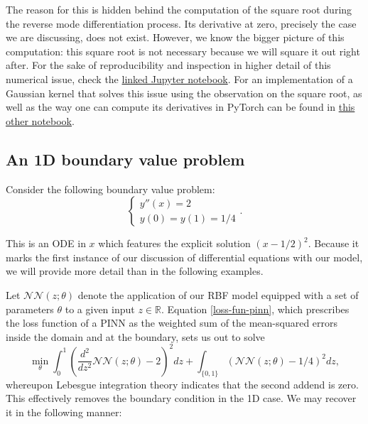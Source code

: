 \documentclass[12pt]{report} %
\begin{document}
The reason for this is hidden behind the computation of the square root during the reverse
mode differentiation process. Its derivative at zero, precisely the case we
are discussing, does not exist.
However, we know the bigger picture of this computation: this square root is not
necessary because we will square it out right after. For the sake of reproducibility
and inspection in higher detail of this numerical issue, check the
\href{https://github.com/heqro/tfm-experiments/blob/main/introductory_notebooks/differentials_computation/differentials_rbf_NANs.ipynb}{linked
  Jupyter notebook}. For an implementation of a Gaussian kernel that solves this issue
using the observation on the square root, as well
as the way one can compute its derivatives in PyTorch can be found in
\href{https://github.com/heqro/tfm-experiments/blob/main/introductory_notebooks/differentials_computation/differentials_rbf_NANs_fixed.ipynb}
{this other notebook}.

\subsection*{An 1D boundary value problem}

Consider the following boundary value problem:
\[ \left\{\begin{array}{l}
    y'' (x) = 2 \\
    y (0) = y (1) = 1 / 4
  \end{array}\right. . \]

This is an ODE in $x$ which features the explicit solution $(x - 1 / 2)^2$.
Because it marks the first instance of our discussion of differential equations
with our model, we will provide more detail than in the following examples.

Let $\mathcal{N}\mathcal{N} (z ; \theta)$ denote the application of our RBF
model equipped with a set of parameters $\theta$ to a given input $z \in
  \mathbb{R}$. Equation \eqref{loss-fun-pinn}, which prescribes the loss function
of a PINN as the weighted sum of the mean-squared errors inside the domain and at
the boundary, sets us out to solve
\begin{equation}
  \min_{\theta}  \int_0^1 \left( \frac{d^2}{d z^2} \mathcal{N}\mathcal{N} (z ;
    \theta) - 2 \right)^2 d z + \int_{\{ 0, 1 \}} (\mathcal{N}\mathcal{N} (z ;
  \theta) - 1 / 4)^2 d z, \label{eqn-lebesgue-ode-1}
\end{equation}
whereupon Lebesgue integration theory indicates that the second addend is zero.
This effectively removes the boundary condition in the 1D case. We may
recover it in the following manner:
\end{document}
